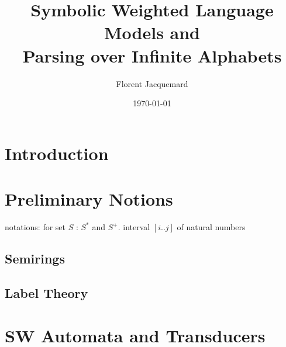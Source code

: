 \documentclass[runningheads]{llncs}
\title{Symbolic Weighted Language Models and\\ Parsing over Infinite Alphabets}
\author{Florent Jacquemard}
\institute{INRIA \& CNAM, Paris, France\\
\email{florent.jacquemard@inria.fr}}
\date{\today}
\begin{document}
\thispagestyle{empty}
\maketitle

\begin{abstract}

\end{abstract}





\section{Introduction} \label{sec:intro}




\section{Preliminary Notions}
\label{section:prelim}\label{sec:prelim}

notations: for set $S$ : $S^*$ and $S^+$.
interval $[i..j]$ of natural numbers

\subsection{Semirings} 
\label{section:semiring}\label{sec:semiring}



\subsection{Label Theory}
\label{section:symbols}





\section{SW Automata and Transducers}
\label{section:transducer}\label{sec:transducer}
\label{section:SWA}\label{sec:SWA}
\label{section:SWT}\label{sec:SWT}
\end{document}
